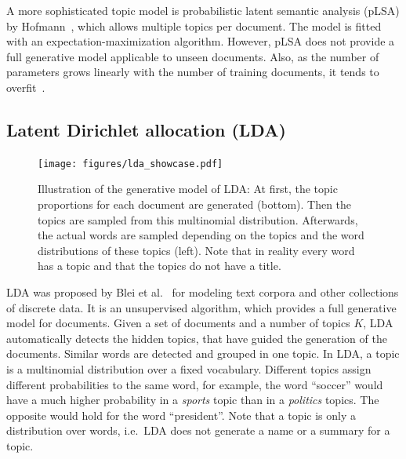 \documentclass[
        a4paper,
        titlepage,
        twoside,
        parskip,
        numbers=noenddot
        ]{scrbook}
\theoremstyle{break}
\begin{document}
A more sophisticated topic model is probabilistic latent semantic analysis (pLSA) by Hofmann~\cite{Hofmann1999}, which allows multiple topics per document.
The model is fitted with an expectation-maximization algorithm.
However, pLSA does not provide a full generative model applicable to unseen documents.
Also, as the number of parameters grows linearly with the number of training documents, it tends to overfit~\cite{Blei2003}.

\subsection{Latent Dirichlet allocation (LDA)}

\begin{figure}
       \centering
       \texttt{[image: figures/lda\_showcase.pdf]}
       \caption{Illustration of the generative model of LDA: At first, the topic proportions for each document are generated (bottom).
       Then the topics are sampled from this multinomial distribution.
       Afterwards, the actual words are sampled depending on the topics and the word distributions of these topics (left).
       Note that in reality every word has a topic and that the topics do not have a title.}
       \label{fig:lda_showcase}
\end{figure}

LDA was proposed by Blei et al.~\cite{Blei2003} for modeling text corpora and other collections of discrete data.
It is an unsupervised algorithm, which provides a full generative model for documents.
Given a set of documents and a number of topics $K$, LDA automatically detects the hidden topics, that have guided the generation of the documents.
Similar words are detected and grouped in one topic.
In LDA, a topic is a multinomial distribution over a fixed vocabulary.
Different topics assign different probabilities to the same word, for example, the word ``soccer'' would have a much higher probability in a \emph{sports} topic than in a \emph{politics} topics.
The opposite would hold for the word ``president''.
Note that a topic is only a distribution over words, i.e.\ LDA does not generate a name or a summary for a topic.
\end{document}
